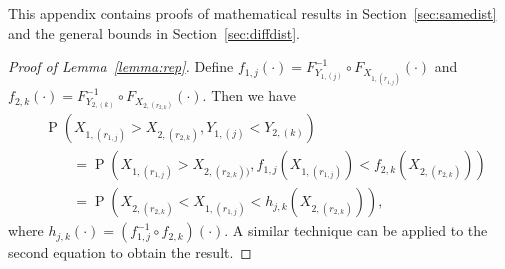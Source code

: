 \documentclass[12pt]{article}
\DeclareMathOperator*{\Prob}{P}
\begin{document}
This appendix contains proofs of mathematical results in Section~\ref{sec:samedist} and the general bounds in Section~\ref{sec:diffdist}. \\


\begin{proof}[Proof of Lemma~\ref{lemma:rep}]
Define $f_{1,j}(\cdot) = F_{Y_{1, (j)}}^{-1} \circ F_{X_{1,(r_{1,j})}} (\cdot)$ and 
$f_{2,k}(\cdot) = F_{Y_{2, (k)}}^{-1} \circ F_{X_{2,(r_{2,k})}} (\cdot)$. Then we have 
\begin{align*}
  &\Prob\left(X_{1,(r_{1,j})} > X_{2,(r_{2,k})}, Y_{1,(j)} < Y_{2,(k)}\right) \\
  &\qquad= \Prob\left(X_{1,(r_{1,j})} > X_{2,(r_{2,k}))}, f_{1,j}(X_{1,(r_{1,j})}) < f_{2,k}(X_{2,(r_{2,k})})\right) \\
  &\qquad= \Prob\left( X_{2,(r_{2,k})} < X_{1,(r_{1,j})}  < h_{j,k}\left(X_{2,(r_{2,k})}\right)\right),
\end{align*}
where $h_{j,k}(\cdot) = (f_{1,j}^{-1} \circ f_{2,k})(\cdot)$. %
A similar technique can be applied to the second equation to obtain the result.
\end{proof}
\end{document}
